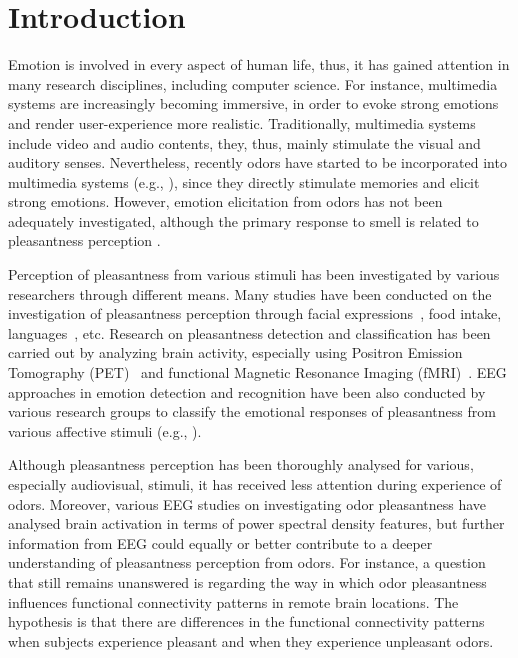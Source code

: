 \section{Introduction}

Emotion is involved in every aspect of human life, thus, it has gained attention in many research disciplines, including computer science. For instance, multimedia systems are increasingly becoming immersive, in order to evoke strong emotions and render user-experience more realistic. Traditionally, multimedia systems include video and audio contents, they, thus, mainly stimulate the visual and auditory senses. Nevertheless, recently odors have started to be incorporated into multimedia systems (e.g., \cite{nakamoto2011olfactory,nakamoto2008cooking,richard2006multi}), since they directly stimulate memories and elicit strong emotions. However, emotion elicitation from odors has not been adequately investigated, although the primary response to smell is related to pleasantness perception \cite{gulas1995right}. 

Perception of pleasantness from various stimuli has been investigated by various researchers through different means. Many studies have been conducted on the investigation of pleasantness perception through facial expressions~\cite{lyons1998coding}, food intake\cite{de2003taste}, languages~\cite{bellezza1986words}, etc. Research on pleasantness detection and classification has been carried out by analyzing brain activity, especially using Positron Emission Tomography (PET)~\cite{zatorre2000neural} and functional Magnetic Resonance Imaging (fMRI)~\cite{kringelbach2003activation}. EEG approaches in emotion detection and recognition have been also conducted by various research groups to classify the emotional responses of pleasantness from various affective stimuli (e.g., ).

Although pleasantness perception has been thoroughly analysed for various, especially audiovisual, stimuli, it has received less attention during experience of odors. Moreover, various EEG studies on investigating odor pleasantness have analysed brain activation in terms of power spectral density features, but further information from EEG could equally or better contribute to a deeper understanding of pleasantness perception from odors. For instance, a question that still remains unanswered is regarding the way in which odor pleasantness influences functional connectivity patterns in remote brain locations. The hypothesis is that there are differences in the functional connectivity patterns when subjects experience pleasant and when they experience unpleasant odors. 

